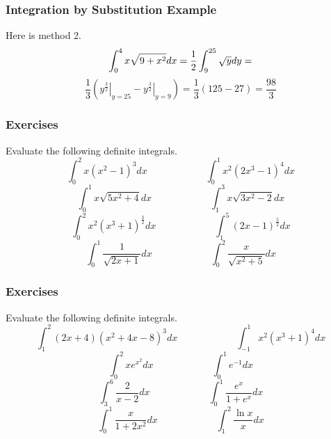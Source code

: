 \documentclass[xcolor=dvipsnames]{beamer}
\begin{document}
\begin{frame}
  \frametitle{Integration by Substitution Example}
Here is method 2.
\begin{equation}
  \label{eq:waethish}
  \int_{0}^{4}x\sqrt{9+x^{2}}dx=\frac{1}{2}\int_{9}^{25}\sqrt{y}dy=\notag
\end{equation}
\begin{equation}
  \label{eq:anguyaeh}
  \frac{1}{3}\left(\left.y^{\frac{3}{2}}\right\vert_{y=25}-\left.y^{\frac{3}{2}}\right\vert_{y=9}\right)=\frac{1}{3}(125-27)=\frac{98}{3}
\end{equation}
\end{frame}

\begin{frame}
  \frametitle{Exercises}
{\ubung} Evaluate the following definite integrals.
\begin{equation}
  \label{eq:mauphouw}
  \int_{0}^{2}x(x^{2}-1)^{3}dx\hspace{1in}\int_{0}^{1}x^{2}(2x^{3}-1)^{4}dx
\end{equation}
\begin{equation}
  \label{eq:pahteeth}
  \int_{0}^{1}x\sqrt{5x^{2}+4}dx\hspace{1in}\int_{1}^{3}x\sqrt{3x^{2}-2}dx
\end{equation}
\begin{equation}
  \label{eq:ceiquoor}
  \int_{0}^{2}x^{2}(x^{3}+1)^{\frac{3}{2}}dx\hspace{1in}\int_{1}^{5}(2x-1)^{\frac{5}{2}}dx
\end{equation}
\begin{equation}
  \label{eq:riweevie}
  \int_{0}^{1}\frac{1}{\sqrt{2x+1}}dx\hspace{1in}\int_{0}^{2}\frac{x}{\sqrt{x^{2}+5}}dx
\end{equation}
\end{frame}

\begin{frame}
  \frametitle{Exercises}
{\ubung} Evaluate the following definite integrals.
\begin{equation}
  \label{eq:aigighau}
  \int_{1}^{2}(2x+4)(x^{2}+4x-8)^{3}dx\hspace{1in}\int_{-1}^{1}x^{2}(x^{3}+1)^{4}dx
\end{equation}
\begin{equation}
  \label{eq:omixughu}
  \int_{0}^{2}xe^{x^{2}}dx\hspace{1in}\int_{0}^{1}e^{-1}dx
\end{equation}
\begin{equation}
  \label{eq:baemixeg}
  \int_{3}^{6}\frac{2}{x-2}dx\hspace{1in}\int_{0}^{1}\frac{e^{x}}{1+e^{x}}dx
\end{equation}
\begin{equation}
  \label{eq:aeteepah}
  \int_{0}^{1}\frac{x}{1+2x^{2}}dx\hspace{1in}\int_{1}^{2}\frac{\ln{}x}{x}dx
\end{equation}
\end{frame}
\end{document}
